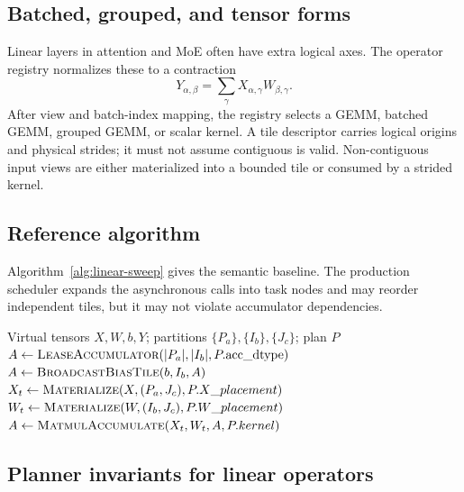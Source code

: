 \subsection{Batched, grouped, and tensor forms}

Linear layers in attention and MoE often have extra logical axes. The operator registry normalizes these to a contraction
\[
  Y_{\alpha,\beta}
   = \sum_{\gamma} X_{\alpha,\gamma}W_{\beta,\gamma}.
\]
After view and batch-index mapping, the registry selects a GEMM, batched GEMM, grouped GEMM, or scalar kernel. A tile descriptor carries logical origins and physical strides; it must not assume contiguous  is valid. Non-contiguous input views are either materialized into a bounded tile or consumed by a strided kernel.

\subsection{Reference algorithm}

Algorithm~\ref{alg:linear-sweep} gives the semantic baseline. The production scheduler expands the asynchronous calls into task nodes and may reorder independent tiles, but it may not violate accumulator dependencies.

\begin{algorithm}[t]
\caption{Bounded output-stationary linear sweep}
\label{alg:linear-sweep}
\begin{algorithmic}[1]
\Require Virtual tensors $X,W,b,Y$; partitions $\{P_a\},\{I_b\},\{J_c\}$; plan $P$
    \State $A\gets \Call{LeaseAccumulator}{|P_a|,|I_b|,P.\mathrm{acc\_dtype}}$
    \State $A\gets \Call{BroadcastBiasTile}{b,I_b,A}$
      \State $X_t\gets \Call{Materialize}{X,(P_a,J_c),P.X\_placement}$
      \State $W_t\gets \Call{Materialize}{W,(I_b,J_c),P.W\_placement}$
      \State $A\gets \Call{MatmulAccumulate}{X_t,W_t,A,P.kernel}$
      \State {}
    \EndFor
    \State {}
    \State {}
  \EndFor
\EndFor
\end{algorithmic}
\end{algorithm}

\subsection{Planner invariants for linear operators}

